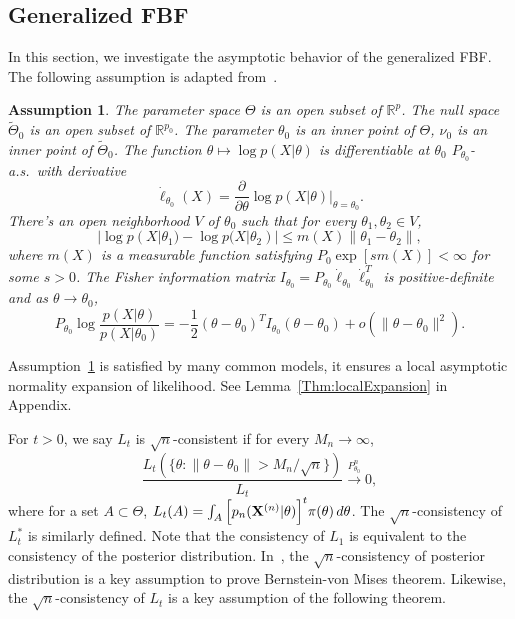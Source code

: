 \documentclass[11pt]{article}
\theoremstyle{plain}
\newtheorem{assumption}{\quad\quad Assumption}
\theoremstyle{definition}
\theoremstyle{remark}
\begin{document}
\subsection{Generalized FBF}
In this section, we investigate the asymptotic behavior of the generalized FBF.
The following assumption is adapted from~\cite{Kleijn2012The}.
\begin{assumption}\label{Assumption1}
The parameter space $\Theta$ is an open subset of $\mathbb{R}^p$. 
    The null space $\tilde{\Theta}_0$ is an open subset of $\mathbb{R}^{p_0}$.
    The parameter $\theta_0$ is an inner point of $\Theta$, $\nu_0$ is an inner point of $\tilde{\Theta}_0$.
    The function $\theta \mapsto \log p(X|\theta)$ is differentiable at $\theta_0$  $P_{\theta_0}$-a.s.\ with derivative 
$$\dot{\ell}_{\theta_0}(X)=\frac{\partial}{\partial \theta}\log p(X|\theta)\Big|_{\theta=\theta_0}.$$
There's an open neighborhood $V$ of $\theta_0$ such that for every $\theta_1,\theta_2\in V$,
        \begin{equation*}
            |\log p(X|\theta_1)-\log p(X|\theta_2)|\leq m(X)\|\theta_1-\theta_2\|,
        \end{equation*}
        where $m(X)$ is a measurable function satisfying $P_{0}\exp[s m(X)]<\infty$ for some $s>0$.
        The Fisher information matrix $I_{\theta_0}=P_{\theta_0}\dot{\ell}_{\theta_0}\dot{\ell}_{\theta_0}^T$ is positive-definite and as $\theta\to \theta_0$,
    \begin{equation*}
        P_{\theta_0} \log \frac{p(X|\theta)}{ p(X|\theta_0)}
        =-\frac{1}{2}(\theta-\theta_0)^T I_{\theta_0} (\theta-\theta_0)+o(\|\theta-\theta_0\|^2).
    \end{equation*}
\end{assumption}     
Assumption~\ref{Assumption1} is satisfied by many common models, it ensures a local asymptotic normality expansion of likelihood. See Lemma~\ref{Thm:localExpansion} in Appendix.

    For $t>0$, we say $L_t$ is $\sqrt{n}$-consistent if for every $M_n\to \infty$,
    $$
    \frac{L_t({\{\theta:\|\theta-\theta_0\|> M_n/\sqrt{n}\}})}{L_t}\xrightarrow{P_{\theta_0}^n} 0,
    $$
    where for a set $A\subset \Theta$, $L_t (A)=\int_{A} \Big[ {p_n(\mathbf{X}^{(n)}|\theta)} \Big]^{t} \pi(\theta) \, d \theta$.
The $\sqrt{n}$-consistency of $L_t^*$ is similarly defined.
    Note that the consistency of $L_1$ is equivalent to the consistency of the posterior distribution.
    In~\cite{Kleijn2012The}, the $\sqrt{n}$-consistency of posterior distribution is a key assumption to prove Bernstein-von Mises theorem.
    Likewise, the $\sqrt{n}$-consistency of $L_t$ is a key assumption of the following theorem.
\end{document}

